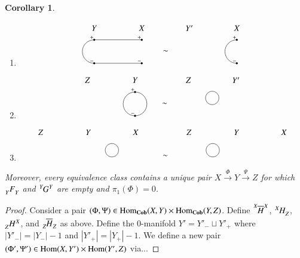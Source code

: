 \documentclass{amsart}
\def\tn{\textnormal}
\def\Hom{\tn{Hom}}
\def\ol{\overline}
\newcommand{\To}[1]{\xrightarrow{#1}}
\def\Cob{{\bf Cob}}
\newcommand{\feeddd}[3]{{\tensor*[^{#2}_{\color{white}{!}}]{{#1}}{^{#3}}}}%
\newcommand{\feeddc}[3]{{\tensor*[^{#2}]{{#1}}{_{#3}}}}
\newcommand{\feedcd}[3]{{\tensor*[_{#2}]{{#1}}{^{#3}}}}
\newcommand{\feedcc}[3]{{\tensor*[^{\color{white}{!}}_{#2}]{{#1}}{_{#3}}}}
\newtheorem{corollary}[subsection]{Corollary}
\theoremstyle{remark}
\theoremstyle{definition}
\begin{document}
\begin{corollary}
\begin{enumerate}
\begin{equation*}
\begin{tikzpicture}
  \draw (1,0.5) arc (90:-90:0.5);
  \node at (3,1) {$Y'$};
 \end{tikzpicture}
\end{equation*}
\item[(E3).] 
\begin{equation*}
 \begin{tikzpicture}
  \node at (-3,1) {$Y$};
  \draw[fill=black] (-3,0.5) circle (1pt);
  \node at (-3.1,0.6) {$\scriptstyle+$};
  \draw[fill=black] (-3,-0.5) circle (1pt);
  \node at (-3.1,-0.4) {$\scriptstyle-$};
  \draw (-3,0.5) arc (90:270:0.5);
  \node at (-1,1) {$X$};
  \draw[fill=black] (-1,0.5) circle (1pt);
  \node at (-1.1,0.6) {$\scriptstyle+$};
  \draw[fill=black] (-1,-0.5) circle (1pt);
  \node at (-1.1,-0.4) {$\scriptstyle-$};
  \draw (-3,0.5) -- (-1,0.5);
  \draw (-3,-0.5) -- (-1,-0.5);
  \node at (0,0) {$\sim$};
  \node at (1,1) {$Y'$};
  \node at (3,1) {$X$};
  \draw[fill=black] (3,0.5) circle (1pt);
  \node at (2.9,0.6) {$\scriptstyle+$};
  \draw[fill=black] (3,-0.5) circle (1pt);
  \node at (2.9,-0.4) {$\scriptstyle-$};
  \draw (3,0.5) arc (90:270:0.5);
 \end{tikzpicture}
\end{equation*}
\item[(E4).] 
\begin{equation*}
 \begin{tikzpicture}
  \node at (-3.25,1) {$Z$};
  \node at (-1.25,1) {$Y$};
  \draw[fill=black] (-1.25,0.5) circle (1pt);
  \node at (-1.35,0.6) {$\scriptstyle+$};
  \draw[fill=black] (-1.25,-0.5) circle (1pt);
  \node at (-1.35,-0.4) {$\scriptstyle-$};
  \draw (-1.25,0.5) arc (90:-90:0.5);
  \draw (-1.25,0.5) arc (90:270:0.5);
  \node at (0,0) {$\sim$};
  \node at (1,1) {$Z$};
  \draw (2,0.25) circle (8pt);
  \node at (3,1) {$Y'$};
 \end{tikzpicture}
\end{equation*}
\item[(E5).] 
\begin{equation*}
 \begin{tikzpicture}
  \node at (-5.25,1) {$Z$};
  \node at (-3.25,1) {$Y$};
  \draw (-2.25,0.25) circle (8pt);
  \node at (-1.25,1) {$X$};
  \node at (0,0) {$\sim$};
  \node at (1,1) {$Z$};
  \draw (2,0.25) circle (8pt);
  \node at (3,1) {$Y$};
  \node at (5,1) {$X$};
 \end{tikzpicture}
\end{equation*}
\end{enumerate}
Moreover, every equivalence class contains a unique pair $X\To{\Phi}Y\To{\Psi}Z$ for which $\feedcc{F}{Y}{Y}$ and $\feeddd{G}{Y}{Y}$ are empty and $\pi_1(\Phi)=0$.

\end{corollary}
\begin{proof}
 Consider a pair $(\Phi,\Psi)\in\Hom_\Cob(X,Y)\times\Hom_\Cob(Y,Z)$.  Define $\feeddd{\ol{H}}{X}{X}$, $\feeddc{H}{X}{Z}$, $\feedcd{H}{Z}{X}$, and $\feedcc{\ol{H}}{Z}{Z}$ as above.  Define the $0$-manifold $Y'=Y'_-\sqcup Y'_+$ where $|Y'_-|=|Y_-|-1$ and $|Y'_+|=|Y_+|-1$.  We define a new pair $(\Phi',\Psi')\in\Hom(X,Y')\times \Hom(Y',Z)$ via...
\end{proof}
\end{document}
